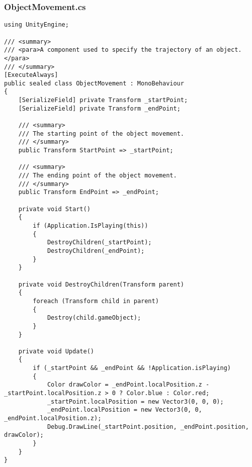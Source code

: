 \subsubsection*{ObjectMovement.cs}
\begin{verbatim}
using UnityEngine;

/// <summary>
/// <para>A component used to specify the trajectory of an object.</para>
/// </summary>
[ExecuteAlways]
public sealed class ObjectMovement : MonoBehaviour
{
    [SerializeField] private Transform _startPoint;
    [SerializeField] private Transform _endPoint;

    /// <summary>
    /// The starting point of the object movement.
    /// </summary>
    public Transform StartPoint => _startPoint;

    /// <summary>
    /// The ending point of the object movement.
    /// </summary>
    public Transform EndPoint => _endPoint;

    private void Start()
    {
        if (Application.IsPlaying(this))
        {
            DestroyChildren(_startPoint);
            DestroyChildren(_endPoint);
        }
    }

    private void DestroyChildren(Transform parent)
    {
        foreach (Transform child in parent)
        {
            Destroy(child.gameObject);
        }
    }

    private void Update()
    {
        if (_startPoint && _endPoint && !Application.isPlaying)
        {
            Color drawColor = _endPoint.localPosition.z - _startPoint.localPosition.z > 0 ? Color.blue : Color.red;
            _startPoint.localPosition = new Vector3(0, 0, 0);
            _endPoint.localPosition = new Vector3(0, 0, _endPoint.localPosition.z);
            Debug.DrawLine(_startPoint.position, _endPoint.position, drawColor);
        }
    }
}
\end{verbatim}
